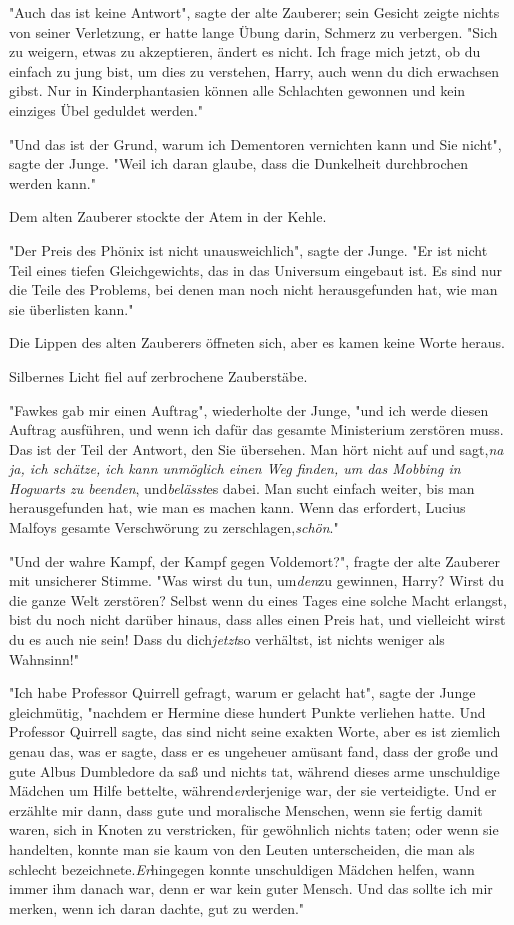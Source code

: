 {"Auch das ist keine Antwort", sagte der alte Zauberer; sein Gesicht zeigte nichts von seiner Verletzung, er hatte lange Übung darin, Schmerz zu verbergen. "Sich zu weigern, etwas zu akzeptieren, ändert es nicht. Ich frage mich jetzt, ob du einfach zu jung bist, um dies zu verstehen, Harry, auch wenn du dich erwachsen gibst. Nur in Kinderphantasien können alle Schlachten gewonnen und kein einziges Übel geduldet werden."

"Und das ist der Grund, warum ich Dementoren vernichten kann und Sie nicht", sagte der Junge. "Weil ich daran glaube, dass die Dunkelheit durchbrochen werden kann."

Dem alten Zauberer stockte der Atem in der Kehle.

"Der Preis des Phönix ist nicht unausweichlich", sagte der Junge. "Er ist nicht Teil eines tiefen Gleichgewichts, das in das Universum eingebaut ist. Es sind nur die Teile des Problems, bei denen man noch nicht herausgefunden hat, wie man sie überlisten kann."

Die Lippen des alten Zauberers öffneten sich, aber es kamen keine Worte heraus.

Silbernes Licht fiel auf zerbrochene Zauberstäbe.

"Fawkes gab mir einen Auftrag", wiederholte der Junge, "und ich werde diesen Auftrag ausführen, und wenn ich dafür das gesamte Ministerium zerstören muss. Das ist der Teil der Antwort, den Sie übersehen. Man hört nicht auf und sagt,\emph{na ja, ich schätze, ich kann unmöglich einen Weg finden, um das Mobbing in Hogwarts zu beenden}, und\emph{belässt}es dabei. Man sucht einfach weiter, bis man herausgefunden hat, wie man es machen kann. Wenn das erfordert, Lucius Malfoys gesamte Verschwörung zu zerschlagen,\emph{schön}."

"Und der wahre Kampf, der Kampf gegen Voldemort?", fragte der alte Zauberer mit unsicherer Stimme. "Was wirst du tun, um\emph{den}zu gewinnen, Harry? Wirst du die ganze Welt zerstören? Selbst wenn du eines Tages eine solche Macht erlangst, bist du noch nicht darüber hinaus, dass alles einen Preis hat, und vielleicht wirst du es auch nie sein! Dass du dich\emph{jetzt}so verhältst, ist nichts weniger als Wahnsinn!"

"Ich habe Professor Quirrell gefragt, warum er gelacht hat", sagte der Junge gleichmütig, "nachdem er Hermine diese hundert Punkte verliehen hatte. Und Professor Quirrell sagte, das sind nicht seine exakten Worte, aber es ist ziemlich genau das, was er sagte, dass er es ungeheuer amüsant fand, dass der große und gute Albus Dumbledore da saß und nichts tat, während dieses arme unschuldige Mädchen um Hilfe bettelte, während\emph{er}derjenige war, der sie verteidigte. Und er erzählte mir dann, dass gute und moralische Menschen, wenn sie fertig damit waren, sich in Knoten zu verstricken, für gewöhnlich nichts taten; oder wenn sie handelten, konnte man sie kaum von den Leuten unterscheiden, die man als schlecht bezeichnete.\emph{Er}hingegen konnte unschuldigen Mädchen helfen, wann immer ihm danach war, denn er war kein guter Mensch. Und das sollte ich mir merken, wenn ich daran dachte, gut zu werden."

}

